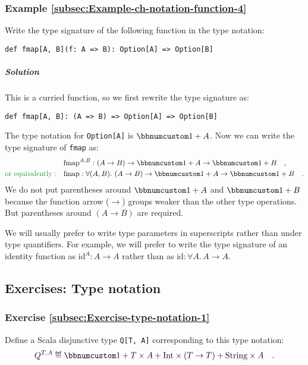 \subsubsection{Example \label{subsec:Example-ch-notation-function-4}\ref{subsec:Example-ch-notation-function-4}}

Write the type signature of the following function in the type notation:
\begin{lstlisting}
def fmap[A, B](f: A => B): Option[A] => Option[B]
\end{lstlisting}


\subparagraph{Solution}

This is a curried function, so we first rewrite the type signature
as:
\begin{lstlisting}
def fmap[A, B]: (A => B) => Option[A] => Option[B]
\end{lstlisting}
The type notation for \lstinline!Option[A]! is $\bbnum 1+A$. Now
we can write the type signature of \lstinline!fmap! as:
\begin{align*}
 & \text{fmap}^{A,B}:\left(A\rightarrow B\right)\rightarrow\bbnum 1+A\rightarrow\bbnum 1+B\quad,\\
{\color{greenunder}\text{or equivalently}:}\quad & \text{fmap}:\forall(A,B).\,\left(A\rightarrow B\right)\rightarrow\bbnum 1+A\rightarrow\bbnum 1+B\quad.
\end{align*}
We do not put parentheses around $\bbnum 1+A$ and $\bbnum 1+B$ because
the function arrow ($\rightarrow$) groups weaker than the other type
operations. But parentheses around $\left(A\rightarrow B\right)$
are required.

We will usually prefer to write type parameters in superscripts rather
than under type quantifiers. For example, we will prefer to write
the type signature of an identity function as $\text{id}^{A}:A\rightarrow A$
rather than as $\text{id}:\forall A.\,A\rightarrow A$.

\subsection{Exercises: Type notation}

\subsubsection{Exercise \label{subsec:Exercise-type-notation-1}\ref{subsec:Exercise-type-notation-1}}

Define a Scala disjunctive type \lstinline!Q[T, A]! corresponding
to this type notation:
\[
Q^{T,A}\triangleq\bbnum 1+T\times A+\text{Int}\times(T\rightarrow T)+\text{String}\times A\quad.
\]


